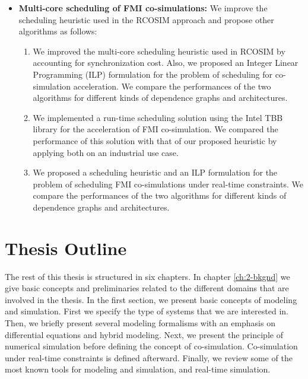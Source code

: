 \begin{itemize}
\begin{enumerate}
\setcounter{enumTemp}{\theenumi}

\end{enumerate}

\item \textbf{Multi-core scheduling of FMI co-simulations:} We improve the scheduling heuristic used in the RCOSIM approach and propose other algorithms as follows:

\begin{enumerate}

\setcounter{enumi}{\theenumTemp}

\item We improved the multi-core scheduling heuristic used in RCOSIM by accounting for synchronization cost. Also, we proposed an Integer Linear Programming (ILP) formulation for the problem of scheduling for co-simulation acceleration. We compare the performances of the two algorithms for different kinds of dependence graphs and architectures.

\item We implemented a run-time scheduling solution using the Intel TBB library \cite{reinders:2007} for the acceleration of FMI co-simulation. We compared the performance of this solution with that of our proposed heuristic by applying both on an industrial use case.

\item We proposed a scheduling heuristic and an ILP formulation for the problem of scheduling FMI co-simulations under real-time constraints. We compare the performances of the two algorithms for different kinds of dependence graphs and architectures.   

\end{enumerate}

\end{itemize}

\section{Thesis Outline}

The rest of this thesis is structured in six chapters. In chapter \ref{ch:2-bkgnd} we give basic concepts and preliminaries related to the different domains that are involved in the thesis. In the first section, we present basic concepts of modeling and simulation. First we specify the type of systems that we are interested in. Then, we briefly present several modeling formalisms with an emphasis on differential equations and hybrid modeling. Next, we present the principle of numerical simulation before defining the concept of co-simulation. Co-simulation under real-time constraints is defined afterward. Finally, we review some of the most known tools for modeling and simulation, and real-time simulation.

